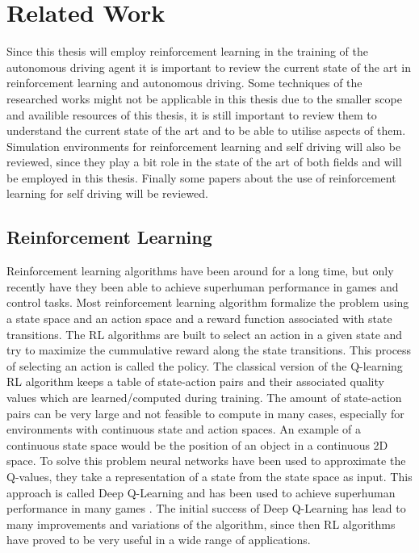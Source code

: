 \chapter{Related Work}
\label{cha:Related Work}

Since this thesis will employ reinforcement learning in the training of the autonomous driving agent it is important to review the current state of the art in reinforcement learning and autonomous driving. Some techniques of the researched works might not be applicable in this thesis due to the smaller scope and availible resources of this thesis, it is still important to review them to understand the current state of the art and to be able to utilise aspects of them. Simulation environments for reinforcement learning and self driving will also be reviewed, since they play a bit role in the state of the art of both fields and will be employed in this thesis.
Finally some papers about the use of reinforcement learning for self driving will be reviewed.


\section{Reinforcement Learning}

Reinforcement learning algorithms have been around for a long time, but only recently have they been able to achieve superhuman performance in games and control tasks. Most reinforcement learning algorithm formalize the problem using a state space and an action space and a reward function associated with state transitions. The RL algorithms are built to select an action in a given state and try to maximize the cummulative reward along the state transitions. This process of selecting an action is called the policy.
The classical version of the Q-learning RL algorithm keeps a table of state-action pairs and their associated quality values which are learned/computed during training. The amount of state-action pairs can be very large and not feasible to compute in many cases, especially for environments with continuous state and action spaces. An example of a continuous state space would be the position of an object in a continuous 2D space. %
To solve this problem neural networks have been used to approximate the Q-values, they take a representation of a state from the state space as input. This approach is called Deep Q-Learning and has been used to achieve superhuman performance in many games \autocite{atari}. The initial success of Deep Q-Learning has lead to many improvements and variations of the algorithm, since then RL algorithms have proved to be very useful in a wide range of applications. %


